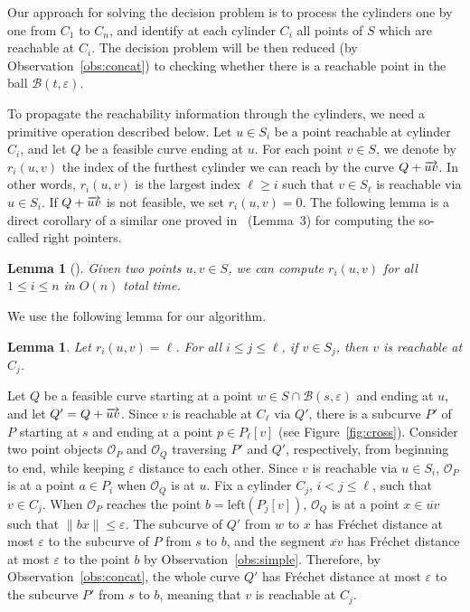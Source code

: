 \documentclass[12pt]{dalthesis}
\def\favoritefont{\bfseries \sffamily}
\def\QED{\ensuremath{{\Box}}}
\def\markatright#1{\leavevmode\unskip\nobreak\quad\hspace*{\fill}{#1}}
\newenvironment{proof}
	{\begin{trivlist}\item[\hskip\labelsep{\favoritefont Proof:}]}
	{\markatright{\QED}\end{trivlist}}
\newtheorem{lemma}[theorem]{Lemma}
\newcommand{\lee}{\leqslant}
\newcommand{\gee}{\geqslant}
\newcommand{\eps}{\varepsilon}
\newcommand{\CB}{{\mathscr B}}
\newcommand{\Frechet}{Fr\'echet }
\newcommand{\CO}{{\mathscr O}}
\newcommand{\Left}{\mbox{left}}
\newcommand{\Seg}[1]{{\overline{#1}}}
\newcommand{\ri}{r}
\begin{document}
Our approach for solving the decision problem is to process the cylinders
one by one from $C_1$ to $C_n$, and identify at each cylinder $C_i$
all points of $S$ which are reachable at $C_i$.
The decision problem will be then reduced (by Observation~\ref{obs:concat}) 
to checking whether there is a reachable point in the ball $\CB(t,\eps)$.

To propagate the reachability information through the cylinders, 
we need a primitive operation described below.
Let $u \in S_i$ be a point reachable at cylinder $C_i$, 
and let $Q$ be a feasible curve ending at $u$.
For each point $v \in S$, 
we denote by $\ri_i(u,v)$ the index of the furthest cylinder 
we can reach by the curve $Q+\overrightarrow{uv}$.
In other words,
$\ri_i(u,v)$ is the largest index $\ell \gee i$ such that 
$v \in S_\ell$ is reachable via $u \in S_i$.
If $Q+\overrightarrow{uv}$ is not feasible, we set $\ri_i(u,v) = 0$.
The following lemma is a direct corollary of a similar one proved in~\cite{AltERW03a}  (Lemma~3)
for computing the so-called right pointers.


\begin{lemma}[\cite{AltERW03a}] \label{lemma:linear}
	Given two points $u,v \in S$,
	we can compute $\ri_i(u,v)$ for all $1 \lee i \lee n$ in $O(n)$ total time.
\end{lemma}

We use the following lemma for our algorithm.

\begin{lemma} \label{lemma:cross}
	Let $\ri_i(u,v) = \ell$.
	For all $i \lee j \lee \ell$,  if $v \in S_j$, then $v$ is reachable at $C_j$.
\end{lemma}

\begin{proof}
	Let $Q$ be a feasible curve starting at a point $w \in S \cap \CB(s,\eps)$ and ending at $u$,
	and let $Q' = Q+\overrightarrow{uv}$.
	Since $v$ is reachable at $C_\ell$ via $Q'$,
	there is a subcurve $P'$ of $P$ starting at $s$ and ending at a point $p \in P_\ell[v]$
	(see Figure~\ref{fig:cross}).
	Consider two point objects $\CO_P$ and $\CO_Q$ 
	traversing $P'$ and $Q'$, respectively, from beginning to end,
	while keeping $\eps$ distance to each other.
	Since $v$ is reachable via $u \in S_i$,
	$\CO_P$ is at a point $a \in P_i$ when $\CO_Q$ is at $u$.
	Fix a cylinder $C_j$,  $i < j \lee \ell$, such that  $v \in C_j$.
	When $\CO_P$ reaches the point $b=\Left(P_j[v])$, 
	$\CO_Q$ is at a point $x \in \Seg{uv}$ such that $\|bx\| \lee \eps$.
	The subcurve of $Q'$ from $w$ to $x$ has \Frechet distance at most $\eps$
	to the subcurve of $P$ from $s$ to $b$,
	and the segment $\Seg{xv}$ has \Frechet distance at most $\eps$ to the point $b$
	by Observation~\ref{obs:simple}.
	Therefore, by Observation~\ref{obs:concat}, 
	the whole curve $Q'$ has \Frechet distance at most $\eps$
	to the subcurve $P'$ from $s$ to $b$,
	meaning that $v$ is reachable at $C_j$.
\end{proof}
\end{document}
